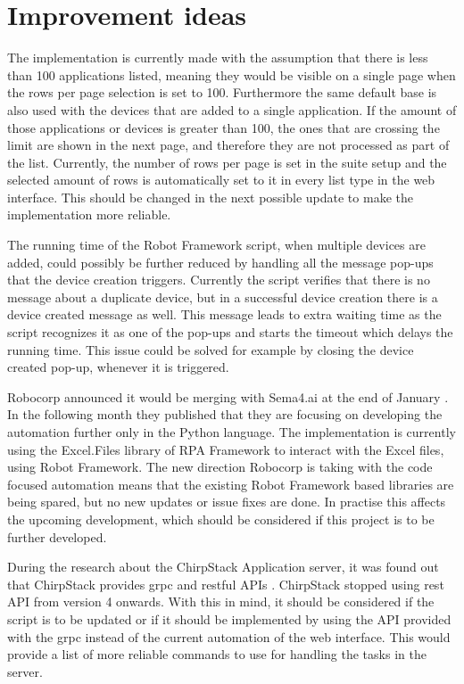 \section{Improvement ideas}

The implementation is currently made with the assumption that there is less than 100 applications listed, meaning they would be visible on a single page when the rows per page selection is set to 100.
Furthermore the same default base is also used with the devices that are added to a single application.
If the amount of those applications or devices is greater than 100, the ones that are crossing the limit are shown in the next page,  and therefore they are not processed as part of the list.
Currently, the number of rows per page is set in the suite setup and the selected amount of rows is automatically set to it in every list type in the web interface.
This should be changed in the next possible update to make the implementation more reliable.

The running time of the Robot Framework script, when multiple devices are added, could possibly be further reduced by handling all the message pop-ups that the device creation triggers.
Currently the script verifies that there is no message about a duplicate device, but in a successful device creation there is a device created message as well. 
This message leads to extra waiting time as the script recognizes it as one of the pop-ups and starts the timeout which delays the running time.
This issue could be solved for example by closing the device created pop-up, whenever it is triggered.

Robocorp announced it would be merging with Sema4.ai at the end of January \cite{robocorp:sema4.ai}.
In the following month they published that they are focusing on developing the automation further only in the Python language.
The implementation is currently using the Excel.Files library of RPA Framework to interact with the Excel files, using Robot Framework.
The new direction Robocorp is taking with the code focused automation means that the existing Robot Framework based libraries are being spared, but no new updates or issue fixes are done.
In practise this affects the upcoming development, which should be considered if this project is to be further developed.

During the research about the ChirpStack Application server, it was found out that ChirpStack provides \gls{grpc} and \gls{rest}ful APIs \cite{chirpstack:applicationServer}.
ChirpStack stopped using \gls{rest} API from version 4 onwards.
With this in mind, it should be considered if the script is to be updated or if it should be implemented by using the API provided with the \gls{grpc} instead of the current automation of the web interface.
This would provide a list of more reliable commands to use for handling the tasks in the server.

